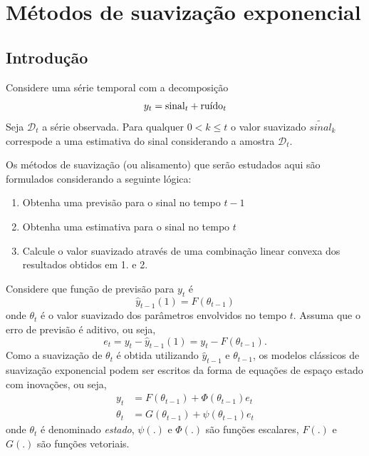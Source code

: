 \documentclass[
  letterpaper,
  DIV=11,
  numbers=noendperiod]{scrreprt}
\providecommand{\tightlist}{%
  \setlength{\itemsep}{0pt}\setlength{\parskip}{0pt}}\usepackage{longtable,booktabs,array}
\theoremstyle{definition}
\theoremstyle{plain}
\theoremstyle{definition}
\theoremstyle{plain}
\theoremstyle{remark}
\begin{document}

\hypertarget{muxe9todos-de-suavizauxe7uxe3o-exponencial}{%
\chapter{Métodos de suavização
exponencial}\label{muxe9todos-de-suavizauxe7uxe3o-exponencial}}

\hypertarget{introduuxe7uxe3o-1}{%
\section{Introdução}\label{introduuxe7uxe3o-1}}

Considere uma série temporal com a decomposição
\[y_t=\hbox{sinal}_t+\hbox{ruído}_t\] Seja \(\mathcal{D}_t\) a série
observada. Para qualquer \(0<k\leq t\) o valor suavizado
\(\tilde{sinal}_k\) correspode a uma estimativa do sinal considerando a
amostra \(\mathcal{D}_t\).

Os métodos de suavização (ou alisamento) que serão estudados aqui são
formulados considerando a seguinte lógica:

\begin{enumerate}
\def\labelenumi{\arabic{enumi}.}
\tightlist
\item
  Obtenha uma previsão para o sinal no tempo \(t-1\)
\item
  Obtenha uma estimativa para o sinal no tempo \(t\)
\item
  Calcule o valor suavizado através de uma combinação linear convexa dos
  resultados obtidos em 1. e 2.
\end{enumerate}

Considere que função de previsão para \(y_t\) é
\[\hat{y}_{t-1}(1)=F(\theta_{t-1})\] onde \(\theta_t\) é o valor
suavizado dos parâmetros envolvidos no tempo \(t\). Assuma que o erro de
previsão é aditivo, ou seja,
\[e_t=y_t-\hat{y}_{t-1}(1)=y_t-F(\theta_{t-1}).\] Como a suavização de
\(\theta_t\) é obtida utilizando \(\hat{y}_{t-1}\) e \(\theta_{t-1}\),
os modelos clássicos de suavização exponencial podem ser escritos da
forma de equações de espaço estado com inovações, ou seja,
\[\begin{align}y_t&=F(\theta_{t-1})+\Phi(\theta_{t-1}) e_t\\
\theta_t&= G(\theta_{t-1})+\psi(\theta_{t-1})e_t
\end{align}\] onde \(\theta_t\) é denominado \emph{estado}, \(\psi(.)\)
e \(\Phi(.)\) são funções escalares, \(F(.)\) e \(G(.)\) são funções
vetoriais.
\end{document}
